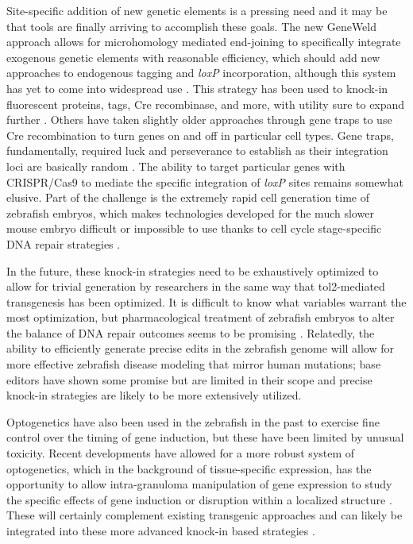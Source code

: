 Site-specific addition of new genetic elements is a pressing need and it may be that tools are finally arriving to accomplish these goals. The new GeneWeld approach allows for microhomology mediated end-joining to specifically integrate exogenous genetic elements with reasonable efficiency, which should add new approaches to endogenous tagging and \textit{loxP} incorporation, although this system has yet to come into widespread use \citep{Wierson2020}. This strategy has been used to knock-in fluorescent proteins, tags, Cre recombinase, and more, with utility sure to expand further \citep{Almeida2021, Liu2022a}. Others have taken slightly older approaches through gene traps to use Cre recombination to turn genes on and off in particular cell types. Gene traps, fundamentally, required luck and perseverance to establish as their integration loci are basically random \citep{Sugimoto2017}. The ability to target particular genes with CRISPR/Cas9 to mediate the specific integration of \textit{loxP} sites remains somewhat elusive. Part of the challenge is the extremely rapid cell generation time of zebrafish embryos, which makes technologies developed for the much slower mouse embryo difficult or impossible to use thanks to cell cycle stage-specific DNA repair strategies \citep{Hustedt2016, Prill2020}.

In the future, these knock-in strategies need to be exhaustively optimized to allow for trivial generation by researchers in the same way that tol2-mediated transgenesis has been optimized. It is difficult to know what variables warrant the most optimization, but pharmacological treatment of zebrafish embryos to alter the balance of DNA repair outcomes seems to be promising \citep{Nakade2014, Luo2018}. Relatedly, the ability to efficiently generate precise edits in the zebrafish genome will allow for more effective zebrafish disease modeling that mirror human mutations; base editors have shown some promise but are limited in their scope and precise knock-in strategies are likely to be more extensively utilized. 

Optogenetics have also been used in the zebrafish in the past to exercise fine control over the timing of gene induction, but these have been limited by unusual toxicity. Recent developments have allowed for a more robust system of optogenetics, which in the background of tissue-specific expression, has the opportunity to allow intra-granuloma manipulation of gene expression to study the specific effects of gene induction or disruption within a localized structure \citep{Deisseroth2015}. These will certainly complement existing transgenic approaches and can likely be integrated into these more advanced knock-in based strategies \citep{Reade2017}.

